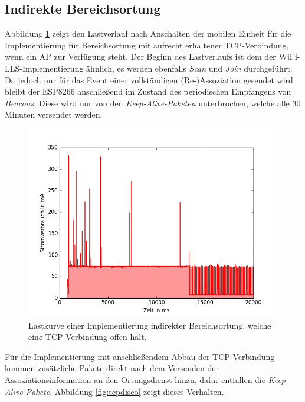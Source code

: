 \subsection{Indirekte Bereichsortung}
\label{ch:phase1:sec:powerindirekt}
Abbildung \ref{fig:tcphold} zeigt den Lastverlauf nach Anschalten der mobilen Einheit für die Implementierung für Bereichsortung mit aufrecht erhaltener TCP-Verbindung, wenn ein AP zur Verfügung steht. 
Der Beginn des Lastverlaufs ist dem der WiFi-LLS-Implementierung ähnlich, es werden ebenfalls \emph{Scan} und \emph{Join} durchgeführt.
Da jedoch nur für das Event einer vollständigen (Re-)Assoziation gesendet wird bleibt der ESP8266 anschließend im Zustand des periodischen Empfangens von \emph{Beacons}.
Diese wird nur von den \emph{Keep-Alive-Paketen} unterbrochen, welche alle 30 Minuten versendet werden.\\

\begin{figure}[h!]
  \centering
	\includegraphics[width=\textwidth]{plots/tcphold.png}
  \caption{Lastkurve einer Implementierung indirekter Bereichsortung, welche eine TCP Verbindung offen hält.}
  \label{fig:tcphold}
\end{figure}

Für die Implementierung mit anschließendem Abbau der TCP-Verbindung kommen zusätzliche Pakete direkt nach dem Versenden der Assoziationsinformation an den Ortungsdienst hinzu, dafür entfallen die \emph{Keep-Alive-Pakete}.
Abbildung \ref{fig:tcpdisco} zeigt dieses Verhalten.\\

